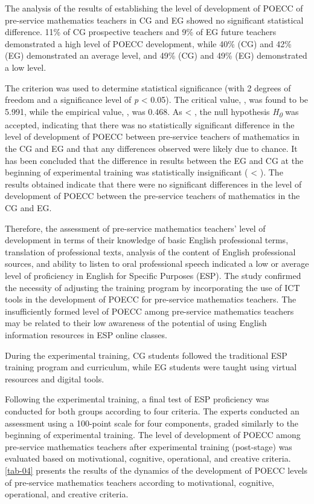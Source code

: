 The analysis of the results of establishing the level of development of
POECC of pre-service mathematics teachers in CG and EG showed no
significant statistical difference. 11\% of CG prospective teachers and
9\% of EG future teachers demonstrated a high level of POECC
development, while 40\% (CG) and 42\% (EG) demonstrated an average
level, and 49\% (CG) and 49\% (EG) demonstrated a low level.

The criterion was used to determine statistical significance (with 2
degrees of freedom and a significance level of \emph{p} \textless{}
0.05). The critical value, , was found to be 5.991, while the empirical
value, , was 0.468. As \textless{} , the null hypothesis
\emph{H}\textsubscript{\emph{0}} was accepted, indicating that there was
no statistically significant difference in the level of development of
POECC between pre-service teachers of mathematics in the CG and EG and
that any differences observed were likely due to chance. It has been
concluded that the difference in results between the EG and CG at the
beginning of experimental training was statistically insignificant (
\textless{} ). The results obtained indicate that there were no
significant differences in the level of development of POECC between the
pre-service teachers of mathematics in the CG and EG.

Therefore, the assessment of pre-service mathematics teachers' level of
development in terms of their knowledge of basic English professional
terms, translation of professional texts, analysis of the content of
English professional sources, and ability to listen to oral professional
speech indicated a low or average level of proficiency in English for
Specific Purposes (ESP). The study confirmed the necessity of adjusting
the training program by incorporating the use of ICT tools in the
development of POECC for pre-service mathematics teachers. The
insufficiently formed level of POECC among pre-service mathematics
teachers may be related to their low awareness of the potential of using
English information resources in ESP online classes.

During the experimental training, CG students followed the traditional
ESP training program and curriculum, while EG students were taught using
virtual resources and digital tools.

Following the experimental training, a final test of ESP proficiency was
conducted for both groups according to four criteria. The experts
conducted an assessment using a 100-point scale for four components,
graded similarly to the beginning of experimental training. The level of
development of POECC among pre-service mathematics teachers after
experimental training (post-stage) was evaluated based on motivational,
cognitive, operational, and creative criteria. \cref{tab-04} presents the
results of the dynamics of the development of POECC levels of
pre-service mathematics teachers according to motivational, cognitive,
operational, and creative criteria.

